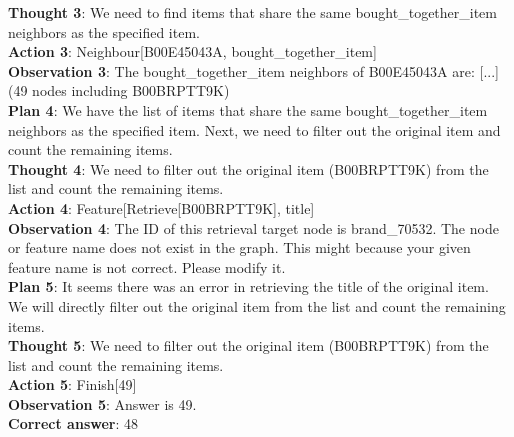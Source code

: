 \documentclass[11pt]{article}
\begin{document}
\begin{tcolorbox}[colback=white!10!white, colframe=blue!30!black, title=Wrong Case (Amazon), boxrule=1pt, fontupper={\fontsize{7pt}{9pt}\selectfont}]
\textbf{Thought 3}: We need to find items that share the same bought\_together\_item neighbors as the specified item.\\
\textbf{Action 3}: Neighbour[B00E45043A, bought\_together\_item]\\
\textbf{Observation 3}: The bought\_together\_item neighbors of B00E45043A are: [...](49 nodes including B00BRPTT9K) \\
\textbf{Plan 4}: We have the list of items that share the same bought\_together\_item neighbors as the specified item. Next, we need to filter out the original item and count the remaining items.\\
\textbf{Thought 4}: We need to filter out the original item (B00BRPTT9K) from the list and count the remaining items.\\
\textbf{Action 4}: Feature[Retrieve[B00BRPTT9K], title]\\
\textbf{Observation 4}: The ID of this retrieval target node is brand\_70532. The node or feature name does not exist in the graph. This might because your given feature name is not correct. Please modify it.\\
\textbf{Plan 5}: It seems there was an error in retrieving the title of the original item. We will directly filter out the original item from the list and count the remaining items.\\
\textbf{Thought 5}: We need to filter out the original item (B00BRPTT9K) from the list and count the remaining items.\\
\textbf{Action 5}: Finish[49]\\
\textbf{Observation 5}: Answer is 49.\\
\textbf{Correct answer}: 48
\end{tcolorbox}
\end{document}
